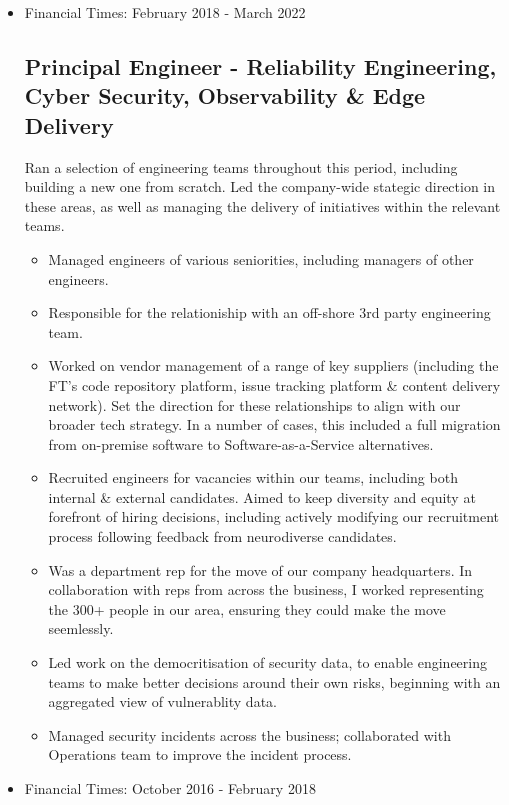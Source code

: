 \documentclass[a4paper]{article}
\newenvironment{detail}{\begin{adjustwidth}{10pt}{}}{\end{adjustwidth}}
\begin{document}
\begin{itemize}
\item Financial Times: February 2018 - March 2022
\subsection*{Principal Engineer - Reliability Engineering, Cyber Security, Observability \& Edge Delivery}
\begin{detail}
Ran a selection of engineering teams throughout this period, including building a new one from scratch.  Led the company-wide stategic direction in these areas, as well as managing the delivery of initiatives within the relevant teams.

\begin{itemize}
	\item Managed engineers of various seniorities, including managers of other engineers.
	\item Responsible for the relationiship with an off-shore 3rd party engineering team.
	\item Worked on vendor management of a range of key suppliers (including the FT's code repository platform, issue tracking platform \& content delivery network).  Set the direction for these relationships to align with our broader tech strategy.  In a number of cases, this included a full migration from on-premise software to Software-as-a-Service alternatives.
	\item Recruited engineers for vacancies within our teams, including both internal \& external candidates.  Aimed to keep diversity and equity at forefront of hiring decisions, including actively modifying our recruitment process following feedback from neurodiverse candidates.
	\item Was a department rep for the move of our company headquarters.  In collaboration with reps from across the business, I worked representing the 300+ people in our area, ensuring they could make the move seemlessly.
	\item Led work on the democritisation of security data, to enable engineering teams to make better decisions around their own risks, beginning with an aggregated view of vulnerablity data.
	\item Managed security incidents across the business; collaborated with Operations team to improve the incident process.
\end{itemize}
\end{detail}


\item Financial Times: October 2016 - February 2018

\end{itemize}
\end{document}
